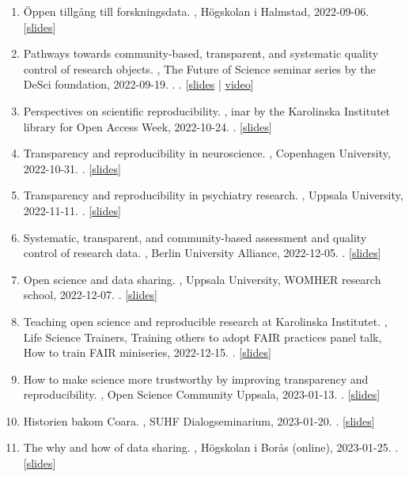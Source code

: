 \documentclass[10pt,a4paper,twocolumn]{article}
\begin{document}
\begin{enumerate}
    \item Öppen tillgång till forskningsdata. , Högskolan i Halmstad, 2022-09-06. [\href{https://osf.io/s26xh}{slides}]

    \item Pathways towards community-based, transparent, and systematic quality control of research objects. , The Future of Science seminar series by the DeSci foundation, 2022-09-19. . . [\href{https://osf.io/4u6jc}{slides} | \href{https://www.youtube.com/watch?v=QqGHW5tb87s}{video}]

    \item Perspectives on scientific reproducibility. , inar by the Karolinska Institutet library for Open Access Week, 2022-10-24. . [\href{https://osf.io/hnju6}{slides}]

    \item Transparency and reproducibility in neuroscience. , Copenhagen University, 2022-10-31. . [\href{https://osf.io/nx2yw}{slides}]

    \item Transparency and reproducibility in psychiatry research. , Uppsala University, 2022-11-11. . [\href{https://osf.io/wnm4r}{slides}]

    \item Systematic, transparent, and community-based assessment and quality control of research data. , Berlin University Alliance, 2022-12-05. . [\href{https://osf.io/wnm4r}{slides}]

    \item Open science and data sharing. , Uppsala University, WOMHER research school, 2022-12-07. . [\href{https://osf.io/bvu2s}{slides}]

    \item Teaching open science and reproducible research at Karolinska Institutet. , Life Science Trainers, Training others to adopt FAIR practices panel talk, How to train FAIR miniseries, 2022-12-15. . [\href{https://osf.io/9s2pd}{slides}]

    \item How to make science more trustworthy by improving transparency and reproducibility. , Open Science Community Uppsala, 2023-01-13. . [\href{https://osf.io/ung8q}{slides}]

    \item Historien bakom Coara. , SUHF Dialogseminarium, 2023-01-20. . [\href{https://osf.io/e8pvs}{slides}]

    \item The why and how of data sharing. , Högskolan i Borås (online), 2023-01-25. . [\href{https://osf.io/ht7d5}{slides}]


\end{enumerate}
\end{document}
